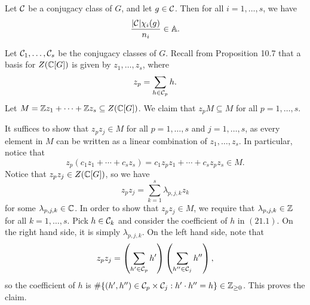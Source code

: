 \begin{lemma}{}
    Let ${\cal C}$ be a conjugacy class of $G$, and let $g \in {\cal C}$. Then 
    for all $i = 1, \dots, s$, we have 
    \[ \frac{|{\cal C}|\chi_i(g)}{n_i} \in \mathbb{A}. \] 
\end{lemma}
\begin{pf}
    Let ${\cal C}_1, \dots, {\cal C}_s$ be the conjugacy classes of $G$. 
    Recall from Proposition 10.7 that a basis for $Z(\mathbb{C}[G])$ is given by 
    $z_1, \dots, z_s$, where 
    \[ z_p = \sum_{h \in {\cal C}_p} h. \] 
    Let $M = \mathbb{Z} z_1 + \cdots + \mathbb{Z} z_s \subseteq Z(\mathbb{C}[G])$. We claim that 
    $z_p M \subseteq M$ for all $p = 1, \dots, s$. 

    It suffices to show that $z_p z_j \in M$ for all $p = 1, \dots, s$ and 
    $j = 1, \dots, s$, as every element in $M$ can be written as a linear 
    combination of $z_1, \dots, z_s$. In particular, notice that 
    \[ z_p(c_1z_1 + \cdots + c_sz_s) = c_1z_pz_1 + \cdots + c_sz_pz_s \in M. \] 
    Notice that $z_p z_j \in Z(\mathbb{C}[G])$, so we have 
    \begin{equation} z_p z_j = \sum_{k=1}^s \lambda_{p,j,k} z_k \end{equation}
    for some $\lambda_{p,j,k} \in \mathbb{C}$. In order to show that $z_p z_j \in M$, 
    we require that $\lambda_{p,j,k} \in \mathbb{Z}$ for all $k = 1, \dots, s$. 
    Pick $h \in {\cal C}_k$ and consider the coefficient of $h$ in $(21.1)$. 
    On the right hand side, it is simply $\lambda_{p,j,k}$. On the left 
    hand side, note that 
    \[ z_p z_j = \left( \sum_{h' \in {\cal C}_p} h' \right) \left( \sum_{h'' \in 
    {\cal C}_j} h'' \right), \] 
    so the coefficient of $h$ is $\#\{(h', h'') \in {\cal C}_p \times {\cal C}_j : 
    h' \cdot h'' = h\} \in \mathbb{Z}_{\geq 0}$. This proves the claim. 


\end{pf}
